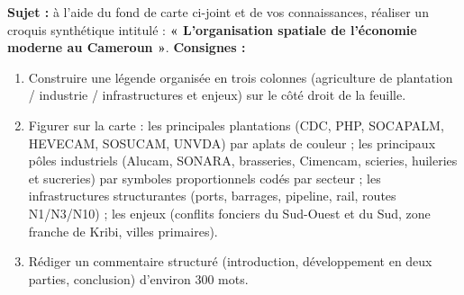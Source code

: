\documentclass[11pt]{article}
\begin{document}
\begin{exercice}
\textbf{Sujet :} à l'aide du fond de carte ci-joint et de vos connaissances, réaliser un croquis synthétique intitulé : \textbf{« L'organisation spatiale de l'économie moderne au Cameroun »}.
\textbf{Consignes :}
\begin{enumerate}
    \item Construire une légende organisée en trois colonnes (agriculture de plantation / industrie / infrastructures et enjeux) sur le côté droit de la feuille.
    \item Figurer sur la carte : les principales plantations (CDC, PHP, SOCAPALM, HEVECAM, SOSUCAM, UNVDA) par aplats de couleur ; les principaux pôles industriels (Alucam, SONARA, brasseries, Cimencam, scieries, huileries et sucreries) par symboles proportionnels codés par secteur ; les infrastructures structurantes (ports, barrages, pipeline, rail, routes N1/N3/N10) ; les enjeux (conflits fonciers du Sud-Ouest et du Sud, zone franche de Kribi, villes primaires).
    \item Rédiger un commentaire structuré (introduction, développement en deux parties, conclusion) d'environ 300 mots.
\end{enumerate}
\end{exercice}
\end{document}
